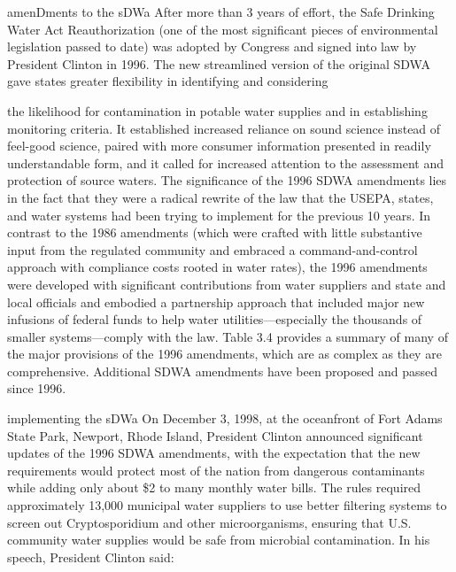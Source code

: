 \documentclass{article}
\begin{document}
amenDments to the sDWa After more than 3 years of effort, the Safe
Drinking Water Act Reauthorization (one of the most significant pieces
of environmental legislation passed to date) was adopted by Congress and
signed into law by President Clinton in 1996. The new streamlined
version of the original SDWA gave states greater flexibility in
identifying and considering

the likelihood for contamination in potable water supplies and in
establishing monitoring criteria. It established increased reliance on
sound science instead of feel-good science, paired with more consumer
information presented in readily understandable form, and it called for
increased attention to the assessment and protection of source waters.
The significance of the 1996 SDWA amendments lies in the fact that they
were a radical rewrite of the law that the USEPA, states, and water
systems had been trying to implement for the previous 10 years. In
contrast to the 1986 amendments (which were crafted with little
substantive input from the regulated community and embraced a
command-and-control approach with compliance costs rooted in water
rates), the 1996 amendments were developed with significant
contributions from water suppliers and state and local officials and
embodied a partnership approach that included major new infusions of
federal funds to help water utilities---especially the thousands of
smaller systems---comply with the law. Table 3.4 provides a summary of
many of the major provisions of the 1996 amendments, which are as
complex as they are comprehensive. Additional SDWA amendments have been
proposed and passed since 1996.

implementing the sDWa On December 3, 1998, at the oceanfront of Fort
Adams State Park, Newport, Rhode Island, President Clinton announced
significant updates of the 1996 SDWA amendments, with the expectation
that the new requirements would protect most of the nation from
dangerous contaminants while adding only about \$2 to many monthly water
bills. The rules required approximately 13,000 municipal water suppliers
to use better filtering systems to screen out Cryptosporidium and other
microorganisms, ensuring that U.S. community water supplies would be
safe from microbial contamination. In his speech, President Clinton
said:
\end{document}

